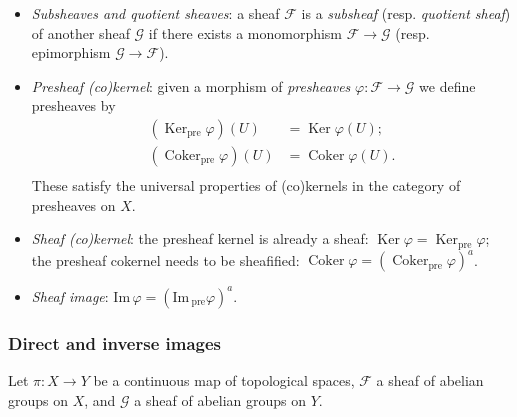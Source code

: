 \documentclass[10pt]{article}
\DeclareMathOperator{\Ker}{Ker}
\DeclareMathOperator{\Coker}{Coker}
\renewcommand{\Im}{\mathrm{Im}\,}
\newcommand{\fsheaf}{\mathcal{F}}
\newcommand{\gsheaf}{\mathcal{G}}
\newcommand{\pre}{\text{pre}}
\begin{document}
                \begin{itemize}
                    \item \textit{Subsheaves and quotient sheaves}: a sheaf $\fsheaf$ is a \textit{subsheaf} (resp. \textit{quotient sheaf}) of another sheaf $\gsheaf$ if there exists a monomorphism $\fsheaf\to\gsheaf$ (resp. epimorphism $\gsheaf\to\fsheaf$).
                    \item \textit{Presheaf (co)kernel}: given a morphism of \textit{presheaves} $\varphi\colon\fsheaf\to\gsheaf$ we define presheaves by 
                        \begin{align*}
                            (\Ker_\pre\varphi)(U) &= \Ker\varphi(U);\\
                            (\Coker_\pre\varphi)(U) &= \Coker\varphi(U).\\
                        \end{align*}
                        These satisfy the universal properties of (co)kernels in the category of presheaves on $X$.
                    \item \textit{Sheaf (co)kernel}: the presheaf kernel is already a sheaf: $\Ker\varphi=\Ker_\pre\varphi$; the presheaf cokernel needs to be sheafified: $\Coker\varphi=(\Coker_\pre\varphi)^a$.
                    \item \textit{Sheaf image}: $\Im\varphi=(\Im_\pre\varphi)^a$.
                \end{itemize}
                
            \subsubsection{Direct and inverse images}
            
                Let $\pi\colon X\to Y$ be a continuous map of topological spaces, $\fsheaf$ a sheaf of abelian groups on $X$, and $\gsheaf$ a sheaf of abelian groups on $Y$.
            
\end{document}
